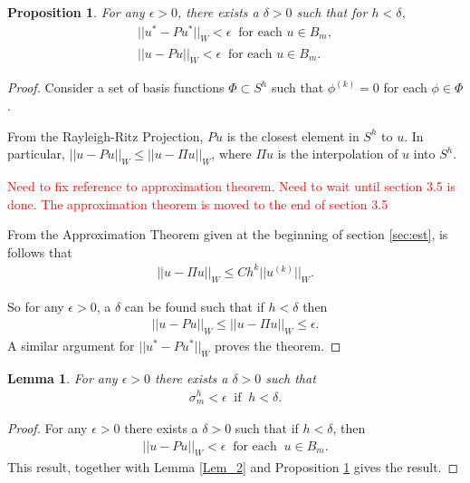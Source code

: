 \documentclass[../../main.tex]{subfiles}
\begin{document}
\newtheorem{Prop_5}[Prop_1]{Proposition} 
\begin{Prop_5}
	\label{Prop_5}
	For any $\epsilon > 0$, there exists a $\delta >0$ such that for $h<\delta$,
	\begin{eqnarray*}
	||u^{*} - Pu^{*}||_{W} < \epsilon \ \textrm{ for each } u \in B_{m},\\
	||u - Pu||_{W} < \epsilon \ \textrm{ for each } u \in B_{m}.
	\end{eqnarray*}
\end{Prop_5}
\begin{proof}
	Consider a set of basis functions $\Phi \subset S^h$ such that $\phi^(k) = 0$ for each $\phi \in \Phi$.

	From the Rayleigh-Ritz Projection, $Pu$ is the closest element in $S^h$ to $u$. In particular, $||u-Pu||_{W}\leq ||u-\Pi u||_{W}$, where $\Pi u$ is the interpolation of $u$ into $S^h$.
	
	\textcolor{red}{Need to fix reference to approximation theorem. Need to wait until section 3.5 is done. The approximation theorem is moved to the end of section 3.5}

	From the Approximation Theorem given at the beginning of section \ref{sec:est}, is follows that
	\begin{eqnarray*}
		||u - \Pi u||_{W} \leq Ch^{k}||u^{(k)}||_{W}.
	\end{eqnarray*}

	So for any $\epsilon > 0$, a $\delta$ can be found such that if $h<\delta$ then
	\begin{eqnarray*}
		||u - Pu||_{W} \leq ||u - \Pi u||_{W} \leq \epsilon.
	\end{eqnarray*}
	A similar argument for $||u^{*} - Pu^{*}||_{W}$ proves the theorem.
\end{proof}


\newtheorem{Lem_3}[Lem_1]{Lemma} 
\begin{Lem_3}
	\label{Lem_3}
	For any $\epsilon >0$ there exists a $\delta > 0$ such that
	\begin{eqnarray}
	\sigma_{m}^{h} < \epsilon \ \textrm{ if } \ h < \delta. \label{eq:lem3}
	\end{eqnarray}
\end{Lem_3}
\begin{proof}
	For any $\epsilon > 0$ there exists a $\delta > 0$ such that if $h<\delta$, then
	\begin{eqnarray*}
	||u-Pu||_{W} < \epsilon \ \textrm{ for each } \ u \in B_{m}.
	\end{eqnarray*}
	This result, together with Lemma \ref{Lem_2} and Proposition \ref{Prop_5} gives the result.
\end{proof}
\end{document}
